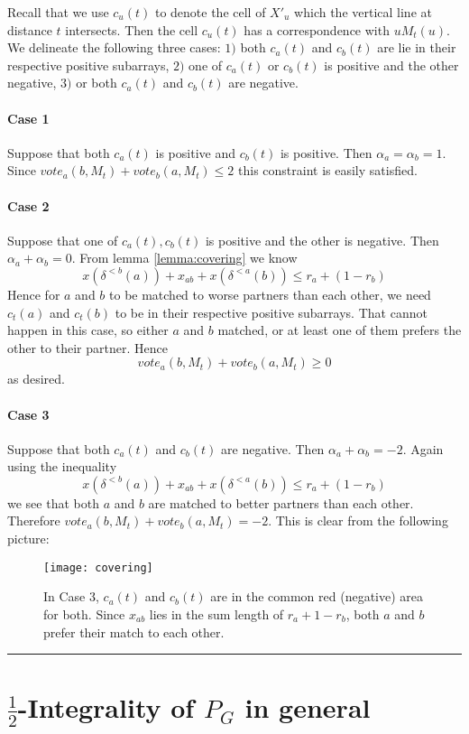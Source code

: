 \documentclass[letterpaper,12pt,oneside,onecolumn]{article}
\newenvironment{proof}{{\bf Proof:  }}{\hfill\rule{2mm}{2mm}}
\begin{document}
\begin{proof} Recall that we use $c_u(t)$ to denote the cell of $X'_u$ which the vertical line at distance $t$ intersects. Then the cell $c_u(t)$ has a correspondence with $uM_t(u)$. We delineate the following three cases: $1)$ both $c_a(t)$ and $c_b(t)$ are lie in their respective positive subarrays, $2)$ one of $c_a(t)$ or $c_b(t)$ is positive and the other negative, $3)$ or both $c_a(t)$ and $c_b(t)$ are negative. 
\paragraph{Case 1}
Suppose that both $c_a(t)$ is positive and $c_b(t)$ is positive. Then $\alpha_a = \alpha_b = 1$. Since $vote_a(b,M_t) + vote_b(a,M_t) \leq 2$ this constraint is easily satisfied.
\paragraph{Case 2}
Suppose that one of $c_a(t), c_b(t)$ is positive and the other is negative. Then $\alpha_a + \alpha_b = 0$. From lemma \ref{lemma:covering} we know
$$x(\delta^{<b}(a)) + x_{ab} + x(\delta^{<a}(b)) \leq r_a + (1-r_b)$$
Hence for $a$ and $b$ to be matched to worse partners than each other, we need $c_t(a)$ and $c_t(b)$ to be in their respective positive subarrays. That cannot happen in this case, so either $a$ and $b$ matched, or at least one of them prefers the other to their partner. Hence 
$$vote_a(b,M_t) + vote_b(a,M_t) \geq 0$$
as desired.
\paragraph{Case 3}
Suppose that both $c_a(t)$ and $c_b(t)$ are negative. Then $\alpha_a + \alpha_b = -2$. Again using the inequality 
$$x(\delta^{<b}(a)) + x_{ab} + x(\delta^{<a}(b)) \leq r_a + (1-r_b)$$
we see that both $a$ and $b$ are matched to better partners than each other. Therefore $vote_a(b,M_t) + vote_b(a,M_t) = -2$. This is clear from the following picture:
\begin{figure}[H]
\centering
\texttt{[image: covering]}
\caption{In Case 3, $c_a(t)$ and $c_b(t)$ are in the common red (negative) area for both. Since $x_{ab}$ lies in the sum length of $r_a + 1-r_b$, both $a$ and $b$ prefer their match to each other.}
\end{figure}
\end{proof}
\section{$\frac{1}{2}$-Integrality of $P_G$ in general}\label{sec:general}
\end{document}
